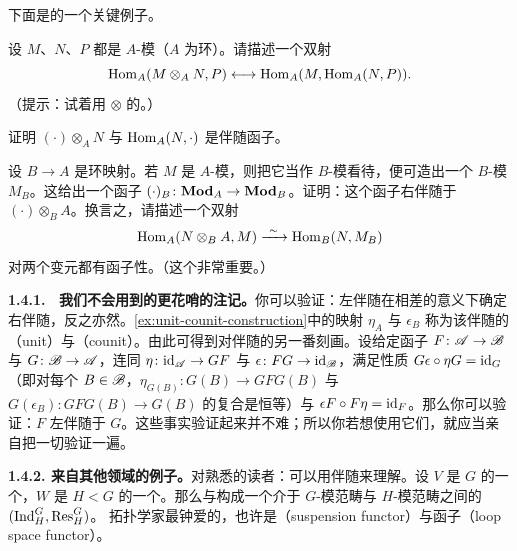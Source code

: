 下面是\trAdjointPair{}的一个关键例子。

\begin{exercise}\label{ex:modules-hom-tensor}
设 $M$、$N$、$P$ 都是 $A$-模（$A$ 为环）。请描述一个双射
\[
\operatorname{Hom}_A(M\otimes_A N,P)\longleftrightarrow\operatorname{Hom}_A(M,\operatorname{Hom}_A(N,P)).
\]
（提示：试着用 $\otimes$ 的\trUniversalProperty。）
\end{exercise}

\begin{exercise}\label{ex:tensor-hom-adjoint}
证明 $(\cdot)\otimes_A N$ 与 $\operatorname{Hom}_A(N,\cdot)$ 是伴随函子。
\end{exercise}

\begin{exercise}\label{ex:extension-of-scalars}
设 $B\to A$ 是环映射。若 $M$ 是 $A$-模，则把它当作 $B$-模看待，便可造出一个 $B$-模 $M_B$。这给出一个函子 $(\cdot)_B\colon\mathbf{Mod}_{A}\to\mathbf{Mod}_{B}$。证明：这个函子右伴随于 $(\cdot)\otimes_B A$。换言之，请描述一个双射
\[
\Hom_A(N\otimes_B A,M)\xrightarrow{\ \sim\ }\Hom_B(N,M_B)
\]
对两个变元都有函子性。（这个\trAdjointPair{}非常重要。）
\end{exercise}

\textbf{1.4.1. \hard\ 我们不会用到的更花哨的注记。}\quad 你可以验证：左伴随在相差\trNaturalIsomorphism{}的意义下确定右伴随，反之亦然。\cref{ex:unit-counit-construction}中的映射 $\eta_A$ 与 $\epsilon_B$ 称为该伴随的\trAdjunctionUnit{}（unit）与\trAdjunctionCounit{}（counit）。由此可得到对伴随的另一番刻画。设给定函子 $F\colon\mathscr{A}\to\mathscr{B}$ 与 $G\colon\mathscr{B}\to\mathscr{A}$，连同\trNaturalTransformation{} $\eta\colon\mathrm{id}_{\mathscr{A}}\to GF$ 与 $\epsilon\colon FG\to\mathrm{id}_{\mathscr{B}}$，满足性质 $G\epsilon\circ\eta G=\mathrm{id}_G$（即对每个 $B\in\mathscr{B}$，$\eta_{G(B)}\colon G(B)\to GFG(B)$ 与 $G(\epsilon_B)\colon GFG(B)\to G(B)$ 的复合是恒等）与 $\epsilon F\circ F\eta=\mathrm{id}_F$。那么你可以验证：$F$ 左伴随于 $G$。这些事实验证起来并不难；所以你若想使用它们，就应当亲自把一切验证一遍。

\textbf{1.4.2. 来自其他领域的例子。}\quad 对熟悉\trRepresentationTheory{}的读者：\trFrobeniusReciprocity{}可以用伴随来理解。设 $V$ 是\trFiniteGroup{} $G$ 的一个\trFiniteDimensional\trRepresentation，$W$ 是\trSubgroup{} $H<G$ 的一个\trRepresentation。那么\trInduction{}与\trRestriction{}构成一个介于 $G$-模范畴与 $H$-模范畴之间的\trAdjointPair{} $(\operatorname{Ind}_H^G,\operatorname{Res}_H^G)$。
拓扑学家最钟爱的\trAdjointPair，也许是\trSuspensionFunctor{}（suspension functor）与\trLoopSpace{}函子（loop space functor）。

